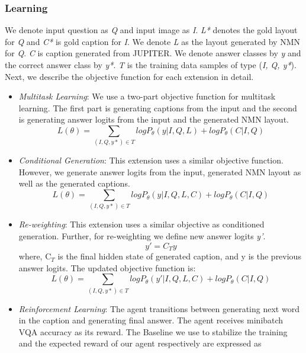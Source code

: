 \subsubsection{Learning}
We denote input question as \textit{Q} and input image as \textit{I}. \textit{L*} denotes the gold layout for \textit{Q} and \textit{C*} is gold caption for \textit{I}. We denote \textit{L} as the layout generated by NMN for \textit{Q}. \textit{C} is caption generated from JUPITER. We denote answer classes by \textit{y} and the correct answer class by \textit{y*}. \textit{T} is the training data samples of type (\textit{I, Q, y*}). Next, we describe the objective function for each extension in detail. 
\begin{itemize}
\item \textit{Multitask Learning}: We use a two-part objective function for multitask learning. The first part is generating  captions from the input and the second is generating answer logits from the input and the generated NMN layout. \\
\begin{equation}
    L(\theta) = \sum_{(I, Q, y*) \in T} logP_\theta(y | I, Q, L) + logP_\theta(C | I, Q)
\end{equation}
 
\item \textit{Conditional Generation}: This extension uses a similar objective function. However, we generate answer logits from the input, generated NMN layout as well as the generated captions.
\begin{equation}
    L(\theta) = \sum_{(I, Q, y*) \in T} logP_\theta(y | I, Q, L, C) + logP_\theta(C | I, Q)
\end{equation}

\item \textit{Re-weighting}: This extension uses a similar objective as conditioned generation. Further, for re-weighting we define new answer logits \textit{y'}. 
\begin{equation}
    y' = C_{T}  y
\end{equation}
where, C$_{T}$ is the final hidden state of generated caption, and y is the previous answer logits. The updated objective function is: 
\begin{equation}
    L(\theta) = \sum_{(I, Q, y*) \in T} logP_\theta(y' | I, Q, L, C) + logP_\theta(C | I, Q)
\end{equation}

\item \textit{Reinforcement Learning}: The agent transitions between generating next word in the caption and generating final answer. The agent receives minibatch VQA accuracy as its reward. The Baseline we use to stabilize the training and  the expected reward of our agent respectively are expressed as 


\end{itemize}
